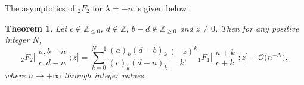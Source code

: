 \documentclass[11pt]{article}
\numberwithin{equation}{section}
\numberwithin{equation}{section}
\newtheorem{Theorem}{Theorem}[section]
\newcommand{\ZZ}{\ensuremath{\mathbb{Z}}}
\newcommand{\mo}{\mathcal{O}}
\begin{document}
The asymptotics of $_2F_2$ for $\lambda=-n$ is given below.
\begin{Theorem}\label{Thm: 2F2 large parameter--n}
	Let $c\notin\ZZ_{\leqslant 0}$, $d\notin\ZZ$, $b-d\notin\ZZ_{\geqslant 0}$ and $z\ne 0$. Then for any positive integer $N$,
	\begin{equation}\label{2F2 large parameter--n}
		{}_2F_2\biggl[\begin{matrix}
			a,b-n\\
			c,d-n
		\end{matrix};z\biggr]=\sum_{k=0}^{N-1}\frac{(a)_k(d-b)_k}{(c)_k(d-n)_k}\frac{(-z)^k}{k!}{}_1F_1\biggl[\begin{matrix}
			a+k\\
			c+k
		\end{matrix};z\biggr]+\mo\big(n^{-N}\big),
	\end{equation}
	where $n\to +\infty$ through integer values.
\end{Theorem}
\end{document}
